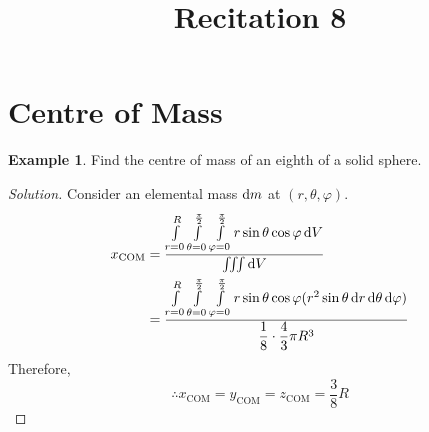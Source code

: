 \documentclass[fleqn, a4paper, 12pt]{article}
\title{Recitation 8}
\author{}
\date{\formatdate{17}{12}{2014}}
\theoremstyle{definition}
\newtheorem{example}{Example}
\theoremstyle{theorem}
\newenvironment{solution}
{\begin{proof}[Solution]\let\qed\relax}
	{\end{proof}}
\begin{document}
\maketitle

\tableofcontents

\newpage
\section{Centre of Mass}

\begin{example}
	Find the centre of mass of an eighth of a solid sphere.
\end{example}

\begin{solution}
	Consider an elemental mass $\dif m$ at $(r, \theta, \varphi)$.
	\begin{align*}
		x_{\text{COM}} &= \dfrac{\int\limits_{r = 0}^{R} \int\limits_{\theta = 0}^{\frac{\pi}{2}} \int\limits_{\varphi = 0}^{\frac{\pi}{2}} r \sin \theta \cos \varphi \dif V}{\iiint \dif V}\\
		&= \dfrac{\int\limits_{r = 0}^{R} \int\limits_{\theta = 0}^{\frac{\pi}{2}} \int\limits_{\varphi = 0}^{\frac{\pi}{2}} r \sin \theta \cos \varphi (r^2 \sin \theta \dif r \dif \theta \dif \varphi)}{\dfrac{1}{8} \cdot \dfrac{4}{3} \pi R^3}
	\end{align*}
	Therefore,
	\begin{equation*}
		\therefore x_{\text{COM}} = y_{\text{COM}} = z_{\text{COM}} = \dfrac{3}{8} R
	\end{equation*}
\end{solution}
\end{document}
